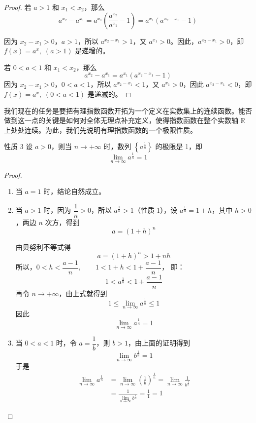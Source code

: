 \begin{proof}
  若 $a>1$ 和 $x_1<x_2$，那么
\[a^{x_2}-a^{x_1}=a^{x_1}\left(\frac{a^{x_2}}{a^{x_1}}-1\right)=a^{x_1}\left(a^{x_2-x_1}-1\right)\]
  
因为 $x_2-x_1>0$，$a>1$，所以 $a^{x_2-x_1}>1$，又 $a^{x_1}>0$。因此，$a^{x_2-x_1}>0$，即 $f(x)=a^x,\; (a>1)$ 是递增的。

若 $0<a<1$ 和 $x_1<x_2$，那么
\[a^{x_2}-a^{x_1}=a^{x_1}\left(a^{x_2-x_1}-1\right)\]
因为 $x_2-x_1>0$，$0<a<1$，所以 $a^{x_2-x_1}<1$，又 $a^{x_1}>0$，因此 $a^{x_2-x_1}<0$，即 $f(x)=a^x,\; (0<a<1)$ 是递减的。
\end{proof}

我们现在的任务是要把有理指数函数开拓为一个定义在实数集上的连续函数。能否做到这一点的关键是如何对全体无理点补充定义，使得指数函数在整个实数轴 $\mathbb{R}$ 上处处连续。为此，我们先说明有理指数函数的一个极限性质。


\begin{Theorem}{性质 3}
  设 $a>0$，则当 $n\to +\infty$ 时，数列 $\left\{a^{\tfrac{1}{n}}\right\}$ 的极限是 1，即
  \[\lim_{n\to\infty}a^{\tfrac{1}{n}}=1\]
\end{Theorem}

\begin{proof}
\begin{enumerate}
  \item 当 $a=1$ 时，结论自然成立。
  \item 当 $a>1$ 时，因为 $\dfrac{1}{n}>0$，所以 $a^{\tfrac{1}{n}}>1$（性质 1），设 $a^{\tfrac{1}{n}}=1+h$，其中 $h>0$，两边 $n$ 次方，得到
  \[ a=(1+h)^n\]
 
  由贝努利不等式得
  \[ a=(1+h)^n>1+nh\]
  所以，$0<h<\dfrac{a-1}{n},\qquad 1<1+h<1+\dfrac{a-1}{n}$， 即：
  \[1<a^{\tfrac{1}{n}}<1+\dfrac{a-1}{n}\]  
  再令 $n\to +\infty$，由上式就得到
  \[1\leqslant \lim_{n\to\infty}a^{\tfrac{1}{n}}\leqslant 1 \]
  因此
  \[\lim_{n\to\infty}a^{\tfrac{1}{n}}=1\]
  \item 当 $0<a<1$ 时，令 $a=\dfrac{1}{b}$，则 $b>1$，由上面的证明得到
  \[\lim_{n\to\infty}b^{\tfrac{1}{n}}=1\]
  于是
  \[\begin{split}
    \lim_{n\to\infty}a^{\tfrac{1}{n}}&=\lim_{n\to\infty}\left(\frac{1}{b}\right)^{\tfrac{1}{n}}=\lim_{n\to\infty}\frac{1}{b^{\tfrac{1}{n}}}\\
    &=\frac{1}{\displaystyle\lim_{n\to\infty}b^{\tfrac{1}{n}}}=\frac{1}{1}=1
  \end{split}\]
\end{enumerate} 
\end{proof}

